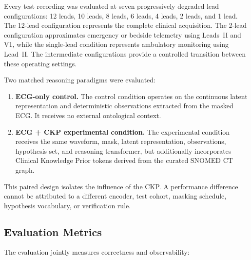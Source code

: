 \documentclass{ssnreview}
\begin{document}
Every test recording was evaluated at seven progressively degraded lead configurations:
12 leads, 10 leads, 8 leads, 6 leads, 4 leads, 2 leads, and 1 lead. The 12-lead
configuration represents the complete clinical acquisition. The 2-lead configuration
approximates emergency or bedside telemetry using Leads~II and V1, while the single-lead
condition represents ambulatory monitoring using Lead~II. The intermediate configurations
provide a controlled transition between these operating settings.

Two matched reasoning paradigms were evaluated:

\begin{enumerate}[label=\arabic*.,leftmargin=*,align=left]
  \item \textbf{ECG-only control.} The control condition operates on the continuous latent
  representation and deterministic observations extracted from the masked ECG. It receives
  no external ontological context.

  \item \textbf{ECG + CKP experimental condition.} The experimental condition receives
  the same waveform, mask, latent representation, observations, hypothesis set, and
  reasoning transformer, but additionally incorporates Clinical Knowledge Prior tokens
  derived from the curated SNOMED CT graph.
\end{enumerate}

This paired design isolates the influence of the CKP. A performance difference cannot be
attributed to a different encoder, test cohort, masking schedule, hypothesis vocabulary, or
verification rule.

\subsection{Evaluation Metrics}

The evaluation jointly measures correctness and observability:
\end{document}
